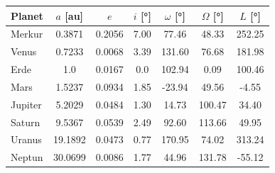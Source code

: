\begin{tabular}{lSSSSSS}
\toprule
Planet &
{$a$      [\si{\astronomicalunit}]} &
{$e$}                               &
{$i$      [\si{\degree}]}           &
{$\omega$ [\si{\degree}]}           &
{$\Omega$ [\si{\degree}]}           &
{$L$      [\si{\degree}]}           \\
\midrule                                                                                      
Merkur  &  0.3871 & 0.2056 &  7.00 &  77.46 &  48.33 & 252.25 \\
Venus   &  0.7233 & 0.0068 &  3.39 & 131.60 &  76.68 & 181.98 \\
Erde    &  1.0    & 0.0167 &  0.0  & 102.94 &   0.09 & 100.46 \\
Mars    &  1.5237 & 0.0934 &  1.85 & -23.94 &  49.56 &  -4.55 \\
Jupiter &  5.2029 & 0.0484 &  1.30 &  14.73 & 100.47 &  34.40 \\
Saturn  &  9.5367 & 0.0539 &  2.49 &  92.60 & 113.66 &  49.95 \\
Uranus  & 19.1892 & 0.0473 &  0.77 & 170.95 &  74.02 & 313.24 \\
Neptun  & 30.0699 & 0.0086 &  1.77 &  44.96 & 131.78 & -55.12 \\
\bottomrule
\end{tabular}
